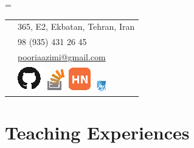 \documentclass{tccv}
\newcommand{\plus}{\raisebox{.1\height}{\scalebox{.8}{+}}}
\begin{document}
{{\needspace{0.5\textheight}%
    \newdimen\boxwidth%
    \boxwidth=\dimexpr{}\fboxsep\relax%
    \colorbox[HTML]{BEDBE3}{%
    \begin{tabularx}{\boxwidth}{c|X}
	    \Writinghand & 
	    {365, E2, Ekbatan, Tehran, Iran}\smallskip\\
	    \Telefon     & 
	    {\plus{ }98 (935) 431 26 45}\smallskip\\
	    \Letter      & 
	    \href{mailto:pooriaazimi@gmail.com}{pooriaazimi@gmail.com}
	    \\[3pt]
	     & 
%
		\href{https://github.com/pooriaazimi/}{\includegraphics{Logos/GitHub.eps}}
%
		\href{http://stackoverflow.com/users/347353/pooria-azimi}{\includegraphics{Logos/StackOverflow.eps}}
%
		\href{https://news.ycombinator.com/user?id=pooriaazimi}{\includegraphics{Logos/HN.eps}}
%		
		\href{http://forum.irmug.com}{\includegraphics[width=14pt]{Logos/IRMUG.pdf}}
%		
	\end{tabularx}}
	





\vspace{8pt}











\section{Teaching Experiences}

\begin{ta}


\end{ta}}}
\end{document}
